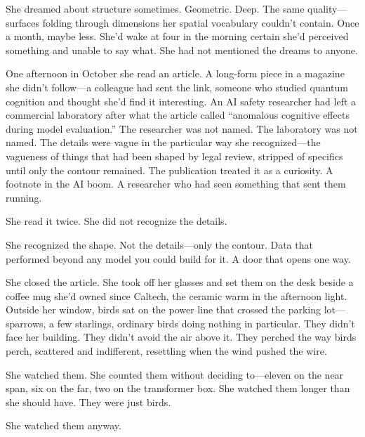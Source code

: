 She dreamed about structure sometimes. Geometric. Deep. The same quality---surfaces folding through dimensions her spatial vocabulary couldn't contain. Once a month, maybe less. She'd wake at four in the morning certain she'd perceived something and unable to say what. She had not mentioned the dreams to anyone.

One afternoon in October she read an article. A long-form piece in a magazine she didn't follow---a colleague had sent the link, someone who studied quantum cognition and thought she'd find it interesting. An AI safety researcher had left a commercial laboratory after what the article called ``anomalous cognitive effects during model evaluation.'' The researcher was not named. The laboratory was not named. The details were vague in the particular way she recognized---the vagueness of things that had been shaped by legal review, stripped of specifics until only the contour remained. The publication treated it as a curiosity. A footnote in the AI boom. A researcher who had seen something that sent them running.

She read it twice. She did not recognize the details.

She recognized the shape. Not the details---only the contour. Data that performed beyond any model you could build for it. A door that opens one way.

She closed the article. She took off her glasses and set them on the desk beside a coffee mug she'd owned since Caltech, the ceramic warm in the afternoon light. Outside her window, birds sat on the power line that crossed the parking lot---sparrows, a few starlings, ordinary birds doing nothing in particular. They didn't face her building. They didn't avoid the air above it. They perched the way birds perch, scattered and indifferent, resettling when the wind pushed the wire.

She watched them. She counted them without deciding to---eleven on the near span, six on the far, two on the transformer box. She watched them longer than she should have. They were just birds.

She watched them anyway.
